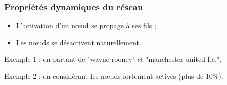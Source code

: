 \documentclass[12pt]{beamer}
\begin{document}
\begin{frame}
 \frametitle{Propriétés dynamiques du réseau}
 
 \begin{itemize}
  \item  L'activation d'un n\oe ud se propage à ses fils ;
  \item Les n\oe uds se désactivent naturellement.
 \end{itemize}
 
 Exemple 1 : en partant de "wayne rooney" et  "manchester united f.c.".
 
 Exemple 2 : en considérant les n\oe uds fortement activés (plus de 10\%).
 
 
\end{frame}
\end{document}
